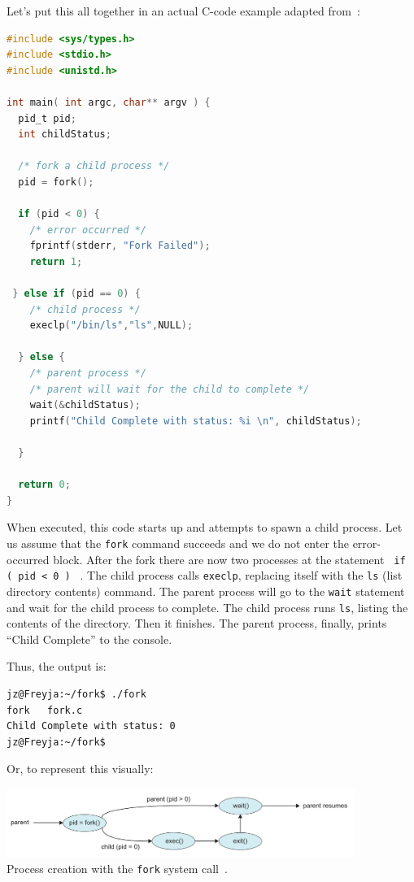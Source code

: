 \documentclass[a4paper]{report}
\begin{document}
Let's put this all together in an actual C-code example adapted from~\cite{osc}:

\begin{lstlisting}[language=C]
#include <sys/types.h>
#include <stdio.h> 
#include <unistd.h>

int main( int argc, char** argv ) {
  pid_t pid;
  int childStatus;

  /* fork a child process */
  pid = fork();
  
  if (pid < 0) { 
    /* error occurred */ 
    fprintf(stderr, "Fork Failed"); 
    return 1;
  
 } else if (pid == 0) {    
    /* child process */
    execlp("/bin/ls","ls",NULL);
    
  } else {    
    /* parent process */
    /* parent will wait for the child to complete */
    wait(&childStatus);
    printf("Child Complete with status: %i \n", childStatus);
    
  }
    
  return 0;
}
\end{lstlisting}

When executed, this code starts up and attempts to spawn a child process. Let us assume that the \texttt{fork} command succeeds and we do not enter the error-occurred block.  After the fork there are now two processes at the statement \texttt{ if ( pid < 0 ) } . The child process calls \texttt{execlp}, replacing itself with the \texttt{ls} (list directory contents) command. The parent process will go to the \texttt{wait} statement and wait for the child process to complete. The child process runs \texttt{ls}, listing the contents of the directory. Then it finishes. The parent process, finally, prints ``Child Complete'' to the console.

Thus, the output is:
\begin{verbatim}
jz@Freyja:~/fork$ ./fork 
fork   fork.c
Child Complete with status: 0
jz@Freyja:~/fork$ 
\end{verbatim}

Or, to represent this visually:

\begin{center}
	\includegraphics[width=0.85\textwidth]{images/fork-syscall.png}\\
	Process creation with the \texttt{fork} system call~\cite{osc}.
\end{center}
\end{document}

